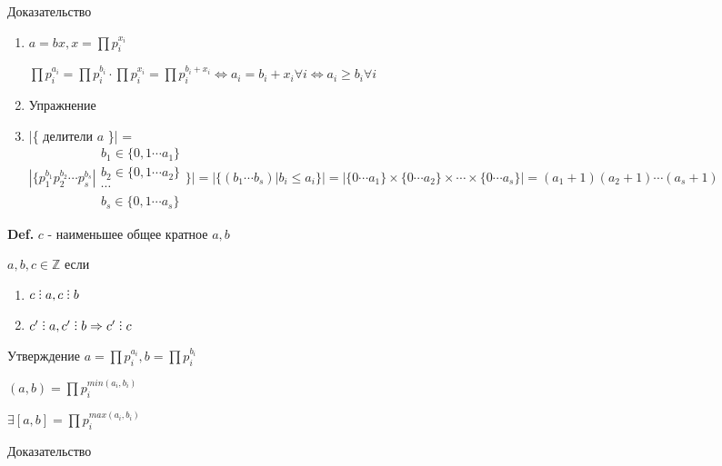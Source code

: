 \documentclass[14pt, letter paper]{article}
\def\divby{%
  \mathrel{\text{\vbox{\baselineskip.65ex\lineskiplimit0pt\hbox{.}\hbox{.}\hbox{.}}}}%
}
\begin{document}
\begin{center}
    Доказательство
\end{center}

\begin{enumerate}
    \item $a = bx, x = \prod p_i^{x_i}$

    $\prod p_i^{a_i} = \prod p_i^{b_i} \cdot \prod p_i^{x_i} = \prod p_i^{b_i + x_i} \Leftrightarrow a_i = b_i + x_i \forall i \Leftrightarrow a_i \geq b_i \forall i$

    \item Упражнение

    \item |\{ делители $a$ \}| = $|\{ p_1^{b_1} p_2^{b_2} \cdots p_s^{b_s} | \begin{gathered} b_1 \in \{ 0, 1 \cdots a_1\} \\ b_2 \in \{ 0, 1 \cdots a_2 \} \\ \cdots \\ b_s \in \{ 0, 1 \cdots a_s \} \end{gathered} \}| = |\{(b_1 \cdots b_s) | b_i \leq a_i \}| = |\{0 \cdots a_1\} \times \{ 0 \cdots a_2 \} \times \cdots \times \{ 0 \cdots a_s \}| = (a_1 + 1)(a_2 + 1) \cdots (a_s + 1)$
\end{enumerate}

\textbf{Def.} $c$ - наименьшее общее кратное $a, b$

$a, b, c \in \mathds{Z}$ если 

\begin{enumerate}
    \item $c \divby a, c \divby b$
    \item $c' \divby a, c' \divby b \Rightarrow c' \divby c$
\end{enumerate}

Утверждение $a = \prod p_i^{a_i}, b = \prod p_i^{b_i}$

$(a, b) = \prod p_i^{min(a_i, b_i)}$

$\exists [a, b] = \prod p_i^{max(a_i, b_i)}$

\begin{center}
    Доказательство
\end{center}
\end{document}
